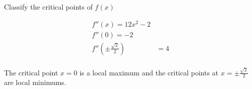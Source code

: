 Classify the critical points of $f(x)$

\begin{solution}
\begin{align*}
    f''(x) = 12x^2 - 2 \\
    f''(0) = -2 \\
    f''\left(\pm\frac{\sqrt{2}}{2}\right) &= 4 \\
\end{align*}

The critical point $x=0$ is a local maximum and the critical points at $x=\pm\frac{\sqrt{2}}{2}$ are local minimums.
\end{solution}
